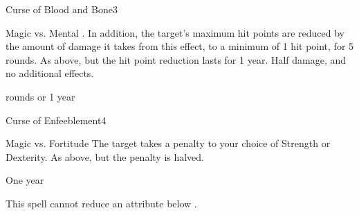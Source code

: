 \begin{spellsection}{Curse of Blood and Bone}{3}
    \begin{spellheader}
    \end{spellheader}
    \begin{spellcontent}
        \begin{spelltargetinginfo}
        \end{spelltargetinginfo}
        \begin{spelleffects}
            \begin{spellattack}{Magic vs. Mental}
                \spellsuccess {}. In addition, the target's maximum hit points are reduced by the amount of damage it takes from this effect, to a minimum of 1 hit point, for 5 rounds.
                \spellcritical As above, but the hit point reduction lasts for 1 year.
                \spellfailure Half damage, and no additional effects.
            \end{spellattack}
             rounds or 1 year
        \end{spelleffects}
    \end{spellcontent}
    \begin{spellfooter}
        \spellnotes \cursespellnotes
        \miscastrandom
    \end{spellfooter}
\end{spellsection}

\begin{spellsection}{Curse of Enfeeblement}{4}
    \begin{spellheader}
    \end{spellheader}
    \begin{spellcontent}
        \begin{spelltargetinginfo}
        \end{spelltargetinginfo}
        \begin{spelleffects}
            \begin{spellattack}{Magic vs. Fortitude}
                \spellsuccess The target takes a  penalty to your choice of Strength or Dexterity.
                \spellfailure As above, but the penalty is halved.
            \end{spellattack}
            \spelldur One year
        \end{spelleffects}
    \end{spellcontent}
    \begin{spellfooter}
        \spellnotes This spell cannot reduce an attribute below . \cursespellnotes
        \miscastrandom
    \end{spellfooter}
\end{spellsection}

